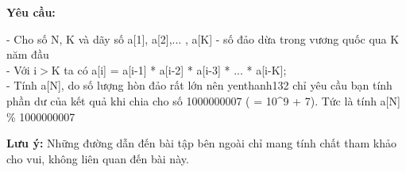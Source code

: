 \textbf{Yêu cầu:
}

- Cho số N, K và dãy số a[1], a[2],... , a[K] - số đảo dừa trong vương quốc qua K năm đầu
\\- Với i$>$K ta có a[i] = a[i-1] * a[i-2] * a[i-3] * ... * a[i-K];
\\- Tính a[N], do số lượng hòn đảo rất lớn nên yenthanh132 chỉ yêu cầu bạn tính phần dư của kết quả khi chia cho số 1000000007 ( = 10^9 + 7). Tức là tính a[N] \% 1000000007

\textbf{Lưu ý: } Những đường dẫn đến bài tập bên ngoài chỉ mang tính chất tham khảo cho vui, không liên quan đến bài này.

 